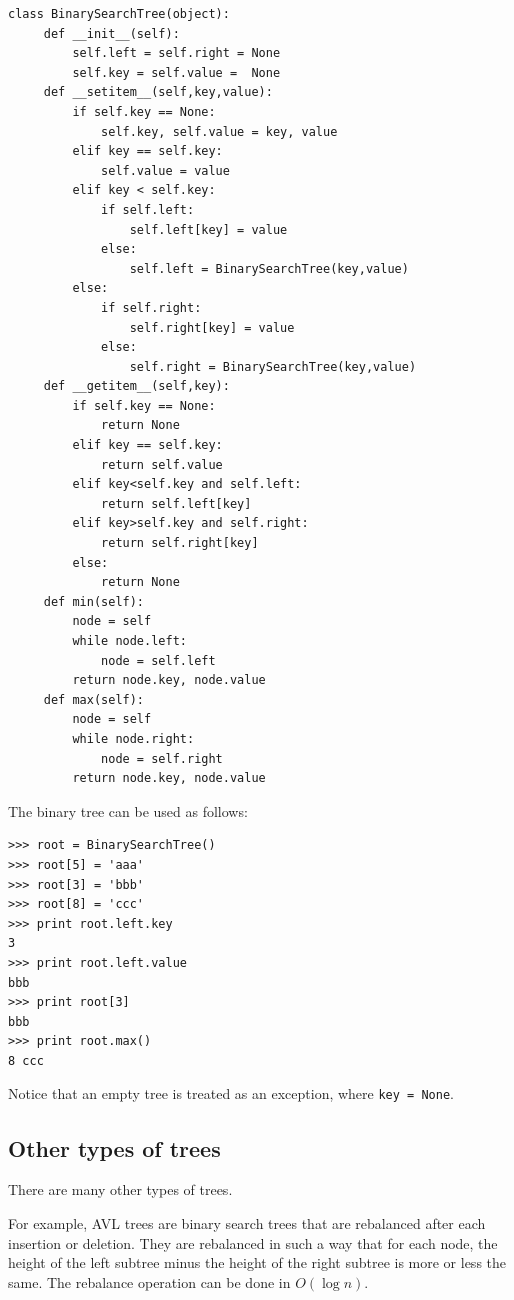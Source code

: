 \documentclass[justified,sixbynine]{tufte-book}
\def\ft{\small\tt}
\theoremstyle{plain}%
\theoremstyle{definition}
\theoremstyle{remark}
\begin{document}
\begin{fullwidth}
\begin{lstlisting}
class BinarySearchTree(object):
     def __init__(self):
         self.left = self.right = None
         self.key = self.value =  None
     def __setitem__(self,key,value):
         if self.key == None:
             self.key, self.value = key, value
         elif key == self.key:
             self.value = value
         elif key < self.key:
             if self.left:
                 self.left[key] = value
             else:
                 self.left = BinarySearchTree(key,value)
         else:
             if self.right:
                 self.right[key] = value
             else:
                 self.right = BinarySearchTree(key,value)
     def __getitem__(self,key):
         if self.key == None:
             return None
         elif key == self.key:
             return self.value
         elif key<self.key and self.left:
             return self.left[key]
         elif key>self.key and self.right:
             return self.right[key]
         else:
             return None
     def min(self):
         node = self
         while node.left:
             node = self.left
         return node.key, node.value
     def max(self):
         node = self
         while node.right:
             node = self.right
         return node.key, node.value
\end{lstlisting}

The binary tree can be used as follows:

\begin{lstlisting}
>>> root = BinarySearchTree()
>>> root[5] = 'aaa'
>>> root[3] = 'bbb'
>>> root[8] = 'ccc'
>>> print root.left.key
3
>>> print root.left.value
bbb
>>> print root[3]
bbb
>>> print root.max()
8 ccc
\end{lstlisting}

Notice that an empty tree is treated as an exception, where {\ft key = None}.

\goodbreak\subsection{Other types of trees}

There are many other types of trees. 

For example, AVL trees are binary search trees that are rebalanced after each
insertion or deletion. They are rebalanced in such a way that for each node, the
height of the left subtree minus the height of the right subtree is more or less the same. The rebalance operation can be done in $O(\log n)$.


\end{fullwidth}
\end{document}
